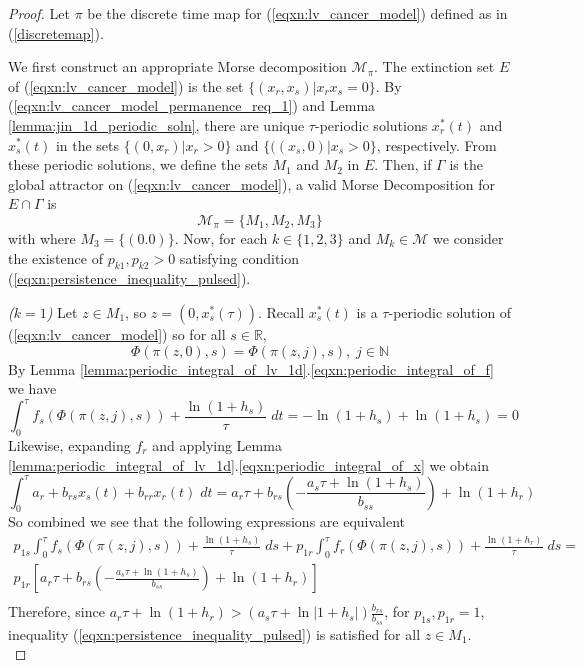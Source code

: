 \documentclass[10pt,a4paper]{amsart}
\newcommand{\N}{{\mathbb{N}}}
\newcommand{\R}{{\mathbb{R}}}
\begin{document}
\begin{proof}
    Let $\pi$ be the discrete time map for (\ref{eqxn:lv_cancer_model}) defined as in (\ref{discretemap}).
    
    We first construct an appropriate Morse decomposition $\mathcal{M}_\pi$. The extinction set $E$ of (\ref{eqxn:lv_cancer_model}) is the set $\{(x_r,x_s)| x_rx_s=0\}$. By (\ref{eqxn:lv_cancer_model_permanence_req_1}) and Lemma \ref{lemma:jin_1d_periodic_soln}, there are unique $\tau$-periodic solutions $x_r^*(t)$ and $x_s^*(t)$ in the sets $\{(0, x_r)|x_r>0\}$ and $\{((x_s,0)|x_s>0\}$, respectively.  From these periodic solutions, we define the sets $M_1$ and $M_2$ in $E$. Then, if $\Gamma$ is the global attractor on (\ref{eqxn:lv_cancer_model}), a valid Morse Decomposition for $E\cap\Gamma$ is  
    $$
    \mathcal{M}_\pi = \{ M_1, M_2, M_3 \}
    $$ with
    where $M_3=\{(0.0)\}$.
    Now, for each $k \in \{1, 2, 3\}$ and $M_k \in \mathcal{M}$ we consider the existence of $p_{k1},p_{k2} >0$ satisfying condition (\ref{eqxn:persistence_inequality_pulsed}).

    \textit{($k = 1$)} 
    Let  $z \in M_1$, so $z = (0,x_s^*(\tau))$. Recall $x_s^*(t)$ is a $\tau$-periodic solution of (\ref{eqxn:lv_cancer_model}) so for all $s \in \R$,
    $$
    \Phi(\pi(z,0),s) = \Phi(\pi(z,j),s), \; j\in \N
    $$ By Lemma \ref{lemma:periodic_integral_of_lv_1d}.\ref{eqxn:periodic_integral_of_f} we have
    $$
    \int_0^\tau f_s(\Phi (\pi(z,j),s)) + \frac{\ln{(1+h_s)}}{\tau} \; dt = -\ln{(1+h_s)} + \ln{(1+h_s)} = 0
    $$
    Likewise, expanding $f_r$ and applying Lemma \ref{lemma:periodic_integral_of_lv_1d}.\ref{eqxn:periodic_integral_of_x} we obtain
    $$
    \int_0^\tau a_r + b_{rs}x_s(t) +b_{rr}x_r(t) \; dt = a_r\tau + b_{rs}\left(-\frac{a_s\tau + \ln{(1+h_s)}}{b_{ss}}\right) + \ln{(1 + h_r)}
    $$ So combined we see that the following expressions are equivalent
    \begin{equation*}
        \begin{split}
            p_{1s} \int_0^\tau f_s(\Phi (\pi(z,j),s)) + \frac{\ln{(1+h_s)}}{\tau} \; ds + p_{1r} \int_0^\tau f_r(\Phi (\pi(z,j),s)) + \frac{\ln{(1+h_r)}}{\tau} \; ds=\\
            p_{1r} \left[a_r\tau + b_{rs}\left(-\frac{a_s\tau + \ln{(1+h_s)}}{b_{ss}}\right) + \ln{(1 + h_r)} \right]\\
        \end{split}
    \end{equation*}
    Therefore, since $a_r\tau + \ln{(1 + h_r)} > \left(a_s\tau + \ln{|1 + h_s|}\right)\frac{b_{rs}}{b_{ss}}$, for $p_{1s}, p_{1r} = 1$, inequality (\ref{eqxn:persistence_inequality_pulsed}) is satisfied for all $z \in M_1$. \\
    

\end{proof}
\end{document}
